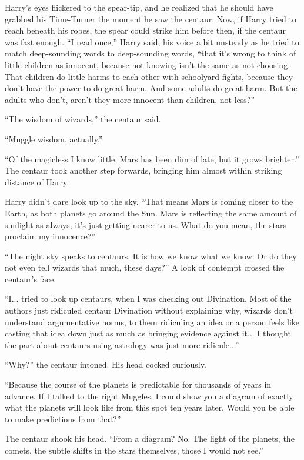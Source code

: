 Harry's eyes flickered to the spear-tip, and he realized that he should have grabbed his Time-Turner the moment he saw the centaur. Now, if Harry tried to reach beneath his robes, the spear could strike him before then, if the centaur was fast enough. ``I read once,'' Harry said, his voice a bit unsteady as he tried to match deep-sounding words to deep-sounding words, ``that it's wrong to think of little children as innocent, because not knowing isn't the same as not choosing. That children do little harms to each other with schoolyard fights, because they don't have the power to do great harm. And some adults do great harm. But the adults who don't, aren't they more innocent than children, not less?''

``The wisdom of wizards,'' the centaur said.

``Muggle wisdom, actually.''

``Of the magicless I know little. Mars has been dim of late, but it grows brighter.'' The centaur took another step forwards, bringing him almost within striking distance of Harry.

Harry didn't dare look up to the sky. ``That means Mars is coming closer to the Earth, as both planets go around the Sun. Mars is reflecting the same amount of sunlight as always, it's just getting nearer to us. What do you mean, the stars proclaim my innocence?''

``The night sky speaks to centaurs. It is how we know what we know. Or do they not even tell wizards that much, these days?'' A look of contempt crossed the centaur's face.

``I... tried to look up centaurs, when I was checking out Divination. Most of the authors just ridiculed centaur Divination without explaining why, wizards don't understand argumentative norms, to them ridiculing an idea or a person feels like casting that idea down just as much as bringing evidence against it... I thought the part about centaurs using astrology was just more ridicule...''

``Why?'' the centaur intoned. His head cocked curiously.

``Because the course of the planets is predictable for thousands of years in advance. If I talked to the right Muggles, I could show you a diagram of exactly what the planets will look like from this spot ten years later. Would you be able to make predictions from that?''

The centaur shook his head. ``From a diagram? No. The light of the planets, the comets, the subtle shifts in the stars themselves, those I would not see.''

